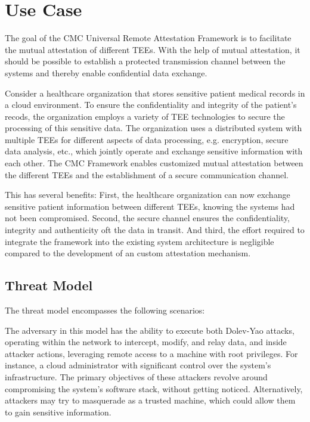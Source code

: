 
\chapter{Use Case}\label{chapter:use_case}
The goal of the CMC Universal Remote Attestation Framework is to facilitate the mutual attestation of different TEEs. With the help of mutual attestation, it should be possible to establish a protected transmission channel between the systems and thereby enable confidential data exchange.

Consider a healthcare organization that stores sensitive patient medical records in a cloud environment. To ensure the confidentiality and integrity of the patient's recods, the organization employs a variety of TEE technologies to secure the processing of this sensitive data.
The organization uses a distributed system with multiple TEEs for different aspects of data processing, e.g. encryption, secure data analysis, etc., which jointly operate and exchange sensitive information with each other.
The CMC Framework enables customized mutual attestation between the different TEEs and the establishment of a secure communication channel. 

This has several benefits:
First, the healthcare organization can now exchange sensitive patient information between different TEEs, knowing the systems had not been compromised. Second, the secure channel ensures the confidentiality, integrity and authenticity oft the data in transit. And third, the effort required to integrate the framework into the existing system architecture is negligible compared to the development of an custom attestation mechanism. 

\section{Threat Model}
The threat model encompasses the following scenarios:

The adversary in this model has the ability to execute both Dolev-Yao attacks, operating within the network to intercept, modify, and relay data, and inside attacker actions, leveraging remote access to a machine with root privileges. \cite{dolev_yao} For instance, a cloud administrator with significant control over the system's infrastructure. 
The primary objectives of these attackers revolve around compromising the system's software stack, without getting noticed. Alternatively, attackers may try to masquerade as a trusted machine, which could allow them to gain sensitive information.  \cite{CMC_paper}

